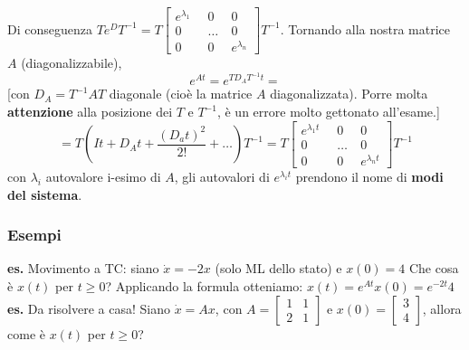 Di conseguenza $T e^{D}T^{-1} = T \left[\begin{matrix}
    e^{\lambda_1} \;\; &0 \;\; &0\\
    0 & \dots &0\\
    0 &0 & e^{\lambda_n}
\end{matrix}\right] T^{-1}$.\newline
Tornando alla nostra matrice $A$ (diagonalizzabile), 
\[
    e^{At}= e^{TD_AT^{-1}t} =
\] 
[con $D_A = T^{-1} A T$ diagonale (cioè la matrice $A$ diagonalizzata). Porre molta \textbf{attenzione} alla posizione dei $T$ e $T^{-1}$, è un errore molto gettonato all'esame.]
\[
    = T(It + D_A t + \frac{(D_at)^2}{2!} + \dots)T^{-1} =  T \left[\begin{matrix}
        e^{\lambda_1t} \;\; &0 \;\; &0\\
        0 & \dots &0\\
        0 &0 & e^{\lambda_nt}
    \end{matrix}\right]T^{-1}
\] con $\lambda_i$ autovalore i-esimo di $A$, gli autovalori di $e^{\lambda_it}$ prendono il nome di \textbf{modi del sistema}.
\subsubsection*{Esempi}
\textbf{es.} Movimento a TC:\newline
siano\newline
$\dot{x} = -2x$ (solo ML dello stato) e $x(0) = 4$\newline
Che cosa è $x(t)$ per $t\geq 0$?\newline
Applicando la formula otteniamo: $x(t) = e^{At}x(0) = e^{-2t}4$\newline
\newline
\textbf{es.} Da risolvere a casa!\newline
Siano $\dot{x} = Ax$, con $A = \left[\begin{matrix}
    1&1\\
    2&1
\end{matrix}\right]$ e $x(0) = \left[\begin{matrix}
    3\\
    4
\end{matrix}\right]$, allora come è $x(t)$ per $t\geq 0$?